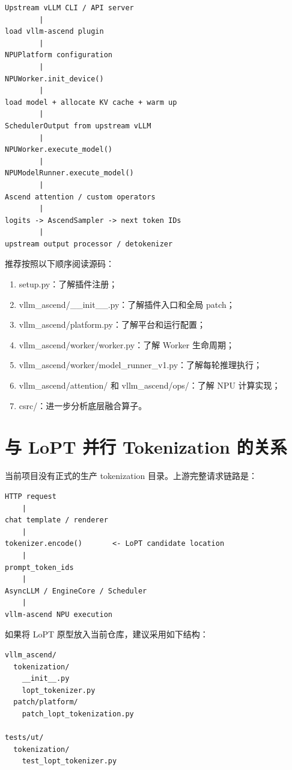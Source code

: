 \documentclass[UTF8,11pt,a4paper]{ctexart}
\DeclareRobustCommand{\folder}[1]{\texttt{\detokenize{#1}}}
\def\folder#1{#1}%
\begin{document}
\begin{lstlisting}
Upstream vLLM CLI / API server
        |
load vllm-ascend plugin
        |
NPUPlatform configuration
        |
NPUWorker.init_device()
        |
load model + allocate KV cache + warm up
        |
SchedulerOutput from upstream vLLM
        |
NPUWorker.execute_model()
        |
NPUModelRunner.execute_model()
        |
Ascend attention / custom operators
        |
logits -> AscendSampler -> next token IDs
        |
upstream output processor / detokenizer
\end{lstlisting}

推荐按照以下顺序阅读源码：

\begin{enumerate}
  \item \folder{setup.py}：了解插件注册；
  \item \folder{vllm_ascend/__init__.py}：了解插件入口和全局 patch；
  \item \folder{vllm_ascend/platform.py}：了解平台和运行配置；
  \item \folder{vllm_ascend/worker/worker.py}：了解 Worker 生命周期；
  \item \folder{vllm_ascend/worker/model_runner_v1.py}：了解每轮推理执行；
  \item \folder{vllm_ascend/attention/} 和 \folder{vllm_ascend/ops/}：了解 NPU 计算实现；
  \item \folder{csrc/}：进一步分析底层融合算子。
\end{enumerate}

\section{与 LoPT 并行 Tokenization 的关系}

当前项目没有正式的生产 tokenization 目录。上游完整请求链路是：

\begin{lstlisting}
HTTP request
    |
chat template / renderer
    |
tokenizer.encode()       <- LoPT candidate location
    |
prompt_token_ids
    |
AsyncLLM / EngineCore / Scheduler
    |
vllm-ascend NPU execution
\end{lstlisting}

如果将 LoPT 原型放入当前仓库，建议采用如下结构：

\begin{lstlisting}
vllm_ascend/
  tokenization/
    __init__.py
    lopt_tokenizer.py
  patch/platform/
    patch_lopt_tokenization.py

tests/ut/
  tokenization/
    test_lopt_tokenizer.py
\end{lstlisting}
\end{document}
